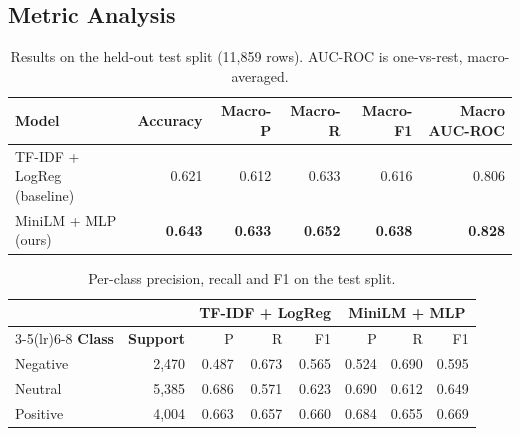 \documentclass[11pt,a4paper]{article}
\begin{document}
\subsection{Metric Analysis}

\begin{table}[H]
\centering
\small
\begin{tabular}{lrrrrr}
\toprule
\textbf{Model} & \textbf{Accuracy} & \textbf{Macro-P} & \textbf{Macro-R} & \textbf{Macro-F1} & \textbf{Macro AUC-ROC} \\
\midrule
TF-IDF + LogReg (baseline) & 0.621 & 0.612 & 0.633 & 0.616 & 0.806 \\
MiniLM + MLP (ours)        & \textbf{0.643} & \textbf{0.633} & \textbf{0.652} & \textbf{0.638} & \textbf{0.828} \\
\bottomrule
\end{tabular}
\caption{Results on the held-out test split (11,859 rows). AUC-ROC is one-vs-rest, macro-averaged.}
\label{tab:test}
\end{table}

\begin{table}[H]
\centering
\small
\begin{tabular}{lrrrrrrr}
\toprule
 & & \multicolumn{3}{c}{\textbf{TF-IDF + LogReg}} & \multicolumn{3}{c}{\textbf{MiniLM + MLP}} \\
\cmidrule(lr){3-5}\cmidrule(lr){6-8}
\textbf{Class} & \textbf{Support} & P & R & F1 & P & R & F1 \\
\midrule
Negative & 2,470 & 0.487 & 0.673 & 0.565 & 0.524 & 0.690 & 0.595 \\
Neutral  & 5,385 & 0.686 & 0.571 & 0.623 & 0.690 & 0.612 & 0.649 \\
Positive & 4,004 & 0.663 & 0.657 & 0.660 & 0.684 & 0.655 & 0.669 \\
\bottomrule
\end{tabular}
\caption{Per-class precision, recall and F1 on the test split.}
\label{tab:perclass}
\end{table}
\end{document}
